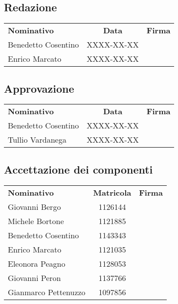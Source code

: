 \subsection{Redazione}
\begin{center}
\begin{tabular}{| l | c | p{8cm} |}
	\rowcolor{LightBlue}
	\color{white}\bfseries Nominativo & 
	\color{white}\bfseries Data & 
	\color{white}\bfseries Firma \\[0.25cm]
	
	Benedetto Cosentino & XXXX-XX-XX & \\
	Enrico Marcato & XXXX-XX-XX & \\ \hline
\end{tabular}
\end{center}

\subsection{Approvazione}

\begin{center}
\begin{tabular}{| l | c | p{8cm} |}
	\rowcolor{LightBlue}
	\color{white}\bfseries Nominativo & 
	\color{white}\bfseries Data & 
	\color{white}\bfseries Firma \\[0.25cm]
	
	Benedetto Cosentino & XXXX-XX-XX & \\
	Tullio Vardanega & XXXX-XX-XX & \\ \hline
\end{tabular}
\end{center}

\subsection{Accettazione dei componenti}
\begin{center}
\begin{tabular}{| l | c | p{8cm} |}%
	\rowcolor{LightBlue}
	\color{white}\bfseries Nominativo & 
	\color{white}\bfseries Matricola & 
	\color{white}\bfseries Firma \\[0.25cm]
	
	Giovanni Bergo & 1126144 & \\
	Michele Bortone & 1121885 & \\
	Benedetto Cosentino & 1143343 & \\	
	Enrico Marcato & 1121035 & \\
	Eleonora Peagno & 1128053 & \\
	Giovanni Peron & 1137766 & \\
	Gianmarco Pettenuzzo & 1097856 & \\ \hline
\end{tabular}
\end{center}